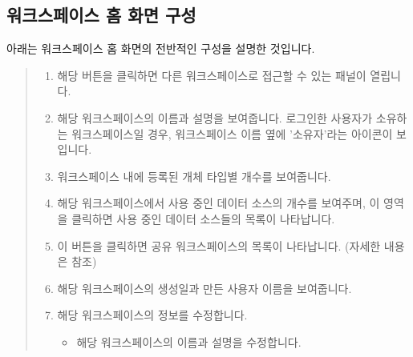 \documentclass[letterpaper,10pt,english]{sphinxmanual}
\begin{document}
\subsection{워크스페이스 홈 화면 구성}
\label{\detokenize{discovery/part03/workspace_management:id2}}
아래는 워크스페이스 홈 화면의 전반적인 구성을 설명한 것입니다.
\begin{quote}

\begin{figure}[H]
\centering

\noindent{}
\end{figure}
\begin{enumerate}
\def\theenumi{\arabic{enumi}}
\def\labelenumi{\theenumi .}
\makeatletter\def\p@enumii{\p@enumi \theenumi .}\makeatother
\item {} 
 해당 버튼을 클릭하면 다른 워크스페이스로 접근할 수 있는 패널이 열립니다.

\item {} 
 해당 워크스페이스의 이름과 설명을 보여줍니다. 로그인한 사용자가 소유하는 워크스페이스일 경우, 워크스페이스 이름 옆에 '소유자'라는 아이콘이 보입니다.

\item {} 
 워크스페이스 내에 등록된 개체 타입별 개수를 보여줍니다.

\item {} 
 해당 워크스페이스에서 사용 중인 데이터 소스의 개수를 보여주며, 이 영역을 클릭하면 사용 중인 데이터 소스들의 목록이 나타납니다.

\item {} 
 이 버튼을 클릭하면 공유 워크스페이스의 목록이 나타납니다. (자세한 내용은 {\hyperref[\detokenize{discovery/part03/shared_workspace:shared-workspace-list}]{}} 참조)

\item {} 
 해당 워크스페이스의 생성일과 만든 사용자 이름을 보여줍니다.

\item {} 
 해당 워크스페이스의 정보를 수정합니다.
\begin{itemize}
\item {} 
 해당 워크스페이스의 이름과 설명을 수정합니다.


\end{itemize}
\end{enumerate}
\end{quote}
\end{document}
